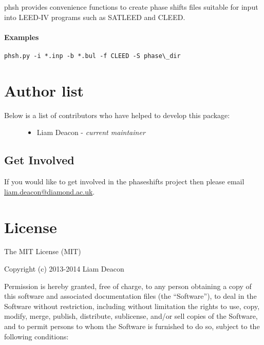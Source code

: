 \documentclass[letterpaper,10pt,english]{sphinxmanual}
\begin{document}
phsh provides convenience functions to create phase shifts files
suitable for input into LEED-IV programs such as SATLEED and CLEED.


\subsubsection{Examples}
\label{modules:id2}
\begin{Verbatim}[commandchars=\\\{\}]
phsh.py -i *.inp -b *.bul -f CLEED -S phase\_dir
\end{Verbatim}


\chapter{Author list}
\label{authors:author-list}\label{authors::doc}\label{authors:authors}\begin{description}
\item[{Below is a list of contributors who have helped to develop this package:}] \leavevmode\begin{itemize}
\item {} 
Liam Deacon - \emph{current maintainer}

\end{itemize}

\end{description}


\section{Get Involved}
\label{authors:get-involved}
If you would like to get involved in the phaseshifts project then
please email \href{mailto:liam.deacon@diamond.ac.uk}{liam.deacon@diamond.ac.uk}.


\chapter{License}
\label{LICENSE::doc}\label{LICENSE:license}\label{LICENSE:id1}
The MIT License (MIT)

Copyright (c) 2013-2014 Liam Deacon

Permission is hereby granted, free of charge, to any person obtaining a copy
of this software and associated documentation files (the ``Software''), to deal
in the Software without restriction, including without limitation the rights
to use, copy, modify, merge, publish, distribute, sublicense, and/or sell
copies of the Software, and to permit persons to whom the Software is
furnished to do so, subject to the following conditions:
\end{document}
